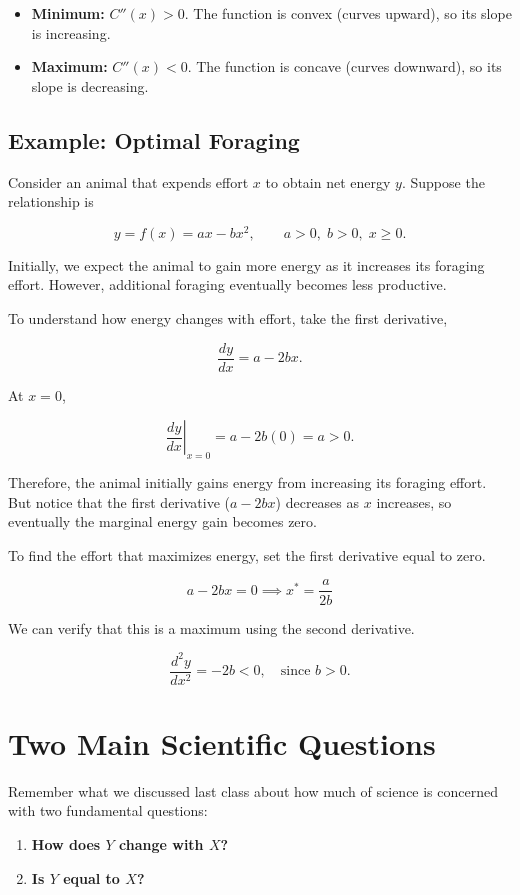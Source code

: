 \documentclass[12pt]{article}
\begin{document}
\begin{itemize}
    \item \textbf{Minimum:} $C''(x) > 0$.
    The function is convex (curves upward), so its
    slope is increasing.

    \item \textbf{Maximum:} $C''(x) < 0$.
    The function is concave (curves downward), so its
    slope is decreasing.
\end{itemize}


\subsection{Example: Optimal Foraging}

Consider an animal that expends effort $x$ to obtain
net energy $y$. Suppose the relationship is

\[y=f(x)=ax-bx^2,
\qquad a>0,\; b>0,\; x\geq 0.
\]

Initially, we expect the animal to gain more energy
as it increases its foraging effort. However,
additional foraging eventually becomes less productive.

To understand how energy changes with effort,
take the first derivative,

\[
\frac{dy}{dx}=a-2bx.
\]

At $x=0$,

\[
\left.\frac{dy}{dx}\right|_{x=0}= a-2b(0) = a>0.
\]

Therefore, the animal initially gains energy from
increasing its foraging effort. But notice that the first derivative (\(a-2bx\)) decreases as $x$
increases, so eventually the marginal energy gain
becomes zero.

To find the effort that maximizes energy,
set the first derivative equal to zero.

\[
a-2bx = 0 \implies x^* = \frac{a}{2b}
\]

We can verify that this is a maximum using
the second derivative.

\[
\frac{d^2y}{dx^2}=-2b<0, \quad \text{since } b >0.
\]

\section{Two Main Scientific Questions}

Remember what we discussed last class about how much of science is concerned with two fundamental questions:

\begin{enumerate}
    \item \textbf{How does $Y$ change with $X$?}
    \item \textbf{Is $Y$ equal to $X$?}
\end{enumerate}
\end{document}
